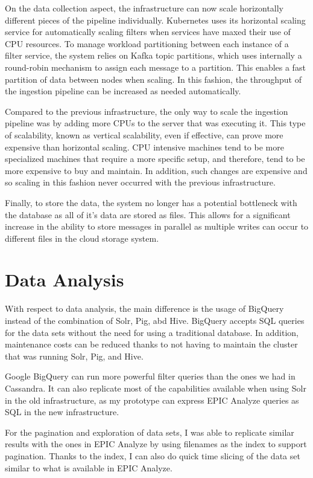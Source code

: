 On the data collection aspect, the infrastructure can now scale horizontally different pieces of the pipeline individually. Kubernetes uses its horizontal scaling service for automatically scaling filters when  services have maxed their use of CPU resources. To manage workload partitioning between each instance of a filter service, the system relies on Kafka topic partitions, which uses internally a round-robin mechanism to assign each message to a partition. This enables a fast partition of data between nodes when scaling. In this fashion, the throughput of the ingestion pipeline can be increased as needed automatically. 

Compared to the previous infrastructure, the only way to scale the ingestion pipeline was by adding more CPUs to the server that was executing it. This type of scalability, known as vertical scalability, even if effective, can prove more expensive than horizontal scaling. CPU intensive machines tend to be more specialized machines that require a more specific setup, and therefore, tend to be more expensive to buy and maintain. In addition, such changes are expensive and so scaling in this fashion never occurred with the previous infrastructure.

Finally, to store the data, the system no longer has a potential bottleneck with the database as all of it's data are stored as files. This allows for a significant increase in the ability to store messages in parallel as multiple writes can occur to different files in the cloud storage system.

\section{Data Analysis}

With respect to data analysis, the main difference is the usage of BigQuery instead of the combination of Solr, Pig, abd Hive. BigQuery accepts SQL queries for the data sets without the need for using a traditional database. In addition, maintenance costs can be reduced thanks to not having to maintain the cluster that was running Solr, Pig, and Hive.

Google BigQuery can run more powerful filter queries than the ones we had in Cassandra. It can also replicate most of the capabilities available when using Solr in the old infrastructure, as my prototype can express EPIC Analyze queries as SQL in the new infrastructure. 

For the pagination and exploration of data sets, I was able to replicate similar results with the ones in EPIC Analyze by using filenames as the index to support pagination. Thanks to the index, I can also do quick time slicing of the data set similar to what is available in EPIC Analyze.

